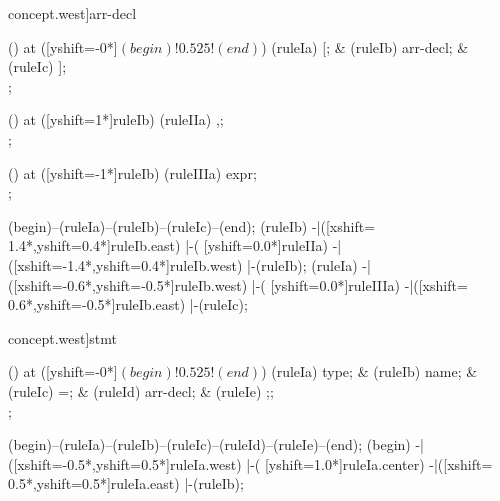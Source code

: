\begin{syntax}[[xshift=22mm]concept.west]{arr-decl}
  
  \node[sequence,column sep=2.0cm] () at ([yshift=-0*\syntaxruledist]$(begin)!0.525!(end)$) {
    \node[terminal]       (ruleIa) {[};
    &
    \node[nonterminal]    (ruleIb) {arr-decl};
    &
    \node[terminal]       (ruleIc) {]};
    \\
  };
  
  \node[sequence] () at ([yshift=1*\syntaxruledist]ruleIb) {
    \node[terminal]    (ruleIIa) {,};
    \\
  };
  
  \node[sequence] () at ([yshift=-1*\syntaxruledist]ruleIb) {
    \node[nonterminal]    (ruleIIIa) {expr};
    \\
  };
  
  \draw[path] (begin)--(ruleIa)--(ruleIb)--(ruleIc)--(end);
  \draw[path] (ruleIb)
            -|([xshift= 1.4*\syntaxruledist,yshift=0.4*\syntaxruledist]ruleIb.east)
            |-(                            [yshift=0.0*\syntaxruledist]ruleIIa)
            -|([xshift=-1.4*\syntaxruledist,yshift=0.4*\syntaxruledist]ruleIb.west)
            |-(ruleIb);
  \draw[path] (ruleIa)
            -|([xshift=-0.6*\syntaxruledist,yshift=-0.5*\syntaxruledist]ruleIb.west)
            |-(                            [yshift=0.0*\syntaxruledist]ruleIIIa)
            -|([xshift= 0.6*\syntaxruledist,yshift=-0.5*\syntaxruledist]ruleIb.east)
            |-(ruleIc);
\end{syntax}

\begin{syntax}[[xshift=22mm]concept.west]{stmt}
  
  \node[sequence,column sep=1.0cm] () at ([yshift=-0*\syntaxruledist]$(begin)!0.525!(end)$) {
    \node[nonterminal]    (ruleIa) {type};
    &
    \node[nonterminal]    (ruleIb) {name};
    &
    \node[terminal]       (ruleIc) {=};
    &
    \node[nonterminal]    (ruleId) {arr-decl};
    &
    \node[terminal]       (ruleIe) {;};
    \\
  };
  
  \draw[path] (begin)--(ruleIa)--(ruleIb)--(ruleIc)--(ruleId)--(ruleIe)--(end);
  \draw[path] (begin)
            -|([xshift=-0.5*\syntaxruledist,yshift=0.5*\syntaxruledist]ruleIa.west)
            |-(                            [yshift=1.0*\syntaxruledist]ruleIa.center)
            -|([xshift= 0.5*\syntaxruledist,yshift=0.5*\syntaxruledist]ruleIa.east)
            |-(ruleIb);
\end{syntax}

